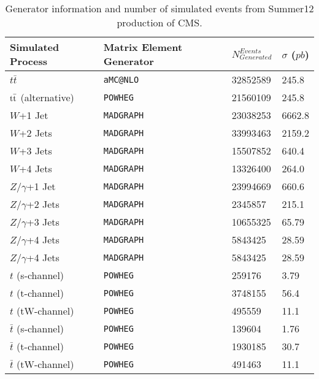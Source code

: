 \begin{table}[h!]
\small
\centering
\begin{tabular}{| p{2.55 cm} | p{4 cm} | p{2 cm} | p{2 cm} |}
\hline
\textbf{Simulated Process} & \textbf{Matrix Element Generator} & $\displaystyle{N^{Events}_{Generated}}$ & \textbf{ $\sigma$ ($\displaystyle{pb}$)}\\[0.5ex]
\hline
$\displaystyle{t\bar{t}}$               & \texttt{aMC@NLO}  & 32852589 & 245.8			\\
$\mathrm{t}\bar{\mathrm{t}}$ (alternative)               & \texttt{POWHEG}  &  21560109 & 245.8			\\
$\displaystyle{W}$+1 Jet                & \texttt{MADGRAPH}              & 23038253 & 6662.8 \\
$\displaystyle{W}$+2 Jets               & \texttt{MADGRAPH}              & 33993463 & 2159.2 \\
$\displaystyle{W}$+3 Jets               & \texttt{MADGRAPH}              & 15507852 & 640.4  \\
$\displaystyle{W}$+4 Jets               & \texttt{MADGRAPH}              & 13326400 & 264.0  \\
$\displaystyle{Z/\gamma}$+1 Jet         & \texttt{MADGRAPH}         	   & 23994669 & 660.6  \\
$\displaystyle{Z/\gamma}$+2 Jets        & \texttt{MADGRAPH}         & 2345857 & 215.1  \\
$\displaystyle{Z/\gamma}$+3 Jets        & \texttt{MADGRAPH}          & 10655325 & 65.79  \\
$\displaystyle{Z/\gamma}$+4 Jets        & \texttt{MADGRAPH}          & 5843425 & 28.59  \\
$\displaystyle{Z/\gamma}$+4 Jets        & \texttt{MADGRAPH}          & 5843425 & 28.59  \\
$\displaystyle{t}$ (s-channel)          & \texttt{POWHEG}        & 259176 & 3.79   \\
$\displaystyle{t}$ (t-channel)          & \texttt{POWHEG}       & 3748155 & 56.4   \\
$\displaystyle{t}$ (tW-channel)         & \texttt{POWHEG}      & 495559 & 11.1   \\
$\displaystyle{\bar{t}}$ (s-channel)    & \texttt{POWHEG}     & 139604 & 1.76   \\
$\displaystyle{\bar{t}}$ (t-channel)    & \texttt{POWHEG}     & 1930185 & 30.7   \\
$\displaystyle{\bar{t}}$ (tW-channel)   & \texttt{POWHEG} & 491463 & 11.1   \\
\hline
\end{tabular}
\caption{\small Generator information and number of simulated events from Summer12 production of CMS.}

\label{tab:sim_samples2}
\end{table}





